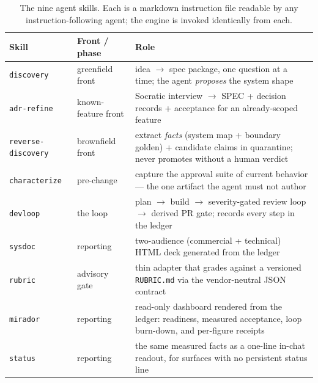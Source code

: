 \documentclass[11pt]{article}
\begin{document}
\begin{table}[t]
\centering
\small
\begin{tabular}{@{}llp{6.4cm}@{}}
\toprule
\textbf{Skill} & \textbf{Front / phase} & \textbf{Role} \\
\midrule
\texttt{discovery} & greenfield front & idea $\to$ spec package, one question
at a time; the agent \emph{proposes} the system shape \\
\texttt{adr-refine} & known-feature front & Socratic interview $\to$ SPEC +
decision records + acceptance for an already-scoped feature \\
\texttt{reverse-discovery} & brownfield front & extract \emph{facts} (system
map + boundary golden) + candidate claims in quarantine; never promotes
without a human verdict \\
\texttt{characterize} & pre-change & capture the approval suite of current
behavior --- the one artifact the agent must not author \\
\texttt{devloop} & the loop & plan $\to$ build $\to$ severity-gated review loop
$\to$ derived PR gate; records every step in the ledger \\
\texttt{sysdoc} & reporting & two-audience (commercial + technical) HTML deck
generated from the ledger \\
\texttt{rubric} & advisory gate & thin adapter that grades against a versioned
\texttt{RUBRIC.md} via the vendor-neutral JSON contract \\
\texttt{mirador} & reporting & read-only dashboard rendered from the ledger:
readiness, measured acceptance, loop burn-down, and per-figure receipts \\
\texttt{status} & reporting & the same measured facts as a one-line in-chat
readout, for surfaces with no persistent status line \\
\bottomrule
\end{tabular}
\caption{The nine agent skills. Each is a markdown instruction file readable by
any instruction-following agent; the engine is invoked identically from each.}
\label{tab:skills}
\end{table}
\end{document}

